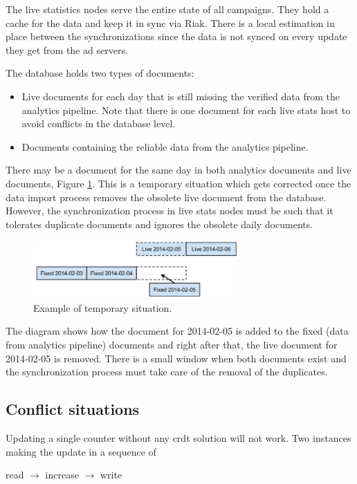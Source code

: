 \documentclass[11pt,a4paper]{report}
\begin{document}
The live statistics nodes serve the entire state of all campaigns. They hold a cache for the data and keep it in sync via Riak. There is a local estimation in place between the synchronizations since the data is not synced on every update they get from the ad servers.

The database holds two types of documents:
\begin{itemize}
	\item Live documents for each day that is still missing the verified data from the analytics pipeline. Note that there is one document for each live stats host to avoid conflicts in the database level.
	\item Documents containing the reliable data from the analytics pipeline.
\end{itemize}

There may be a document for the same day in both analytics documents and live documents, Figure \ref{fig:example_temporary sitiation}. This is a temporary situation which gets corrected once the data import process removes the obsolete live document from the database. However, the synchronization process in live stats nodes must be such that it tolerates duplicate documents and ignores the obsolete daily documents.

\begin{figure}[!h]
	\centering
	\includegraphics[width=0.7\textwidth]{./img/image2.png}

	\caption{Example of temporary situation.}
	\label{fig:example_temporary sitiation}
\end{figure}

The diagram shows how the document for 2014-02-05 is added to the fixed (data from analytics pipeline) documents and right after that, the live document for 2014-02-05 is removed. There is a small window when both documents exist and the synchronization process must take care of the removal of the duplicates.

\subsection{Conflict situations}
Updating a single counter without any \gls{crdt} solution will not work. Two instances making the update in a sequence of 
\begin{center}
read $\rightarrow$ increase $\rightarrow$ write 
\end{center}
\end{document}
